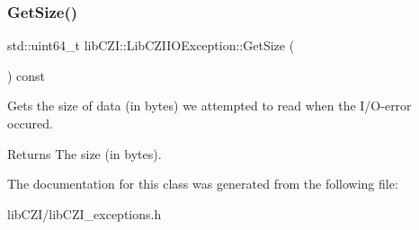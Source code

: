 \subsubsection{\texorpdfstring{Get\+Size()}{GetSize()}}
{\footnotesize\ttfamily std\+::uint64\+\_\+t lib\+C\+Z\+I\+::\+Lib\+C\+Z\+I\+I\+O\+Exception\+::\+Get\+Size (\begin{DoxyParamCaption}{ }\end{DoxyParamCaption}) const\hspace{0.3cm}{\ttfamily [inline]}}

Gets the size of data (in bytes) we attempted to read when the I/\+O-\/error occured.

\begin{DoxyReturn}{Returns}
The size (in bytes). 
\end{DoxyReturn}


The documentation for this class was generated from the following file\+:\begin{DoxyCompactItemize}
\item 
lib\+C\+Z\+I/lib\+C\+Z\+I\+\_\+exceptions.\+h\end{DoxyCompactItemize}
